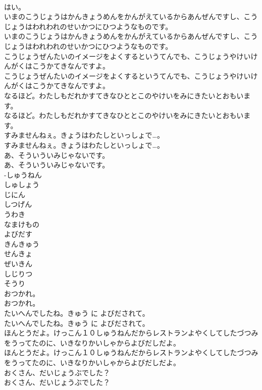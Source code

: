 \documentclass[8pt]{extreport}
\begin{document}
\begin{CJK}{UTF8}{min}
\\	はい。 
\\	いまのこうじょうはかんきょうめんをかんがえているからあんぜんですし、こうじょうはわれわれのせいかつにひつようなものです。	
\\	いまのこうじょうはかんきょうめんをかんがえているからあんぜんですし、こうじょうはわれわれのせいかつにひつようなものです。 
\\	こうじょうぜんたいのイメージをよくするというてんでも、こうじょうやけいけんがくはこうかてきなんですよ。	
\\	こうじょうぜんたいのイメージをよくするというてんでも、こうじょうやけいけんがくはこうかてきなんですよ。 
\\	なるほど。わたしもだれかすてきなひととこのやけいをみにきたいとおもいます。	
\\	なるほど。わたしもだれかすてきなひととこのやけいをみにきたいとおもいます。 
\\	すみませんねぇ。きょうはわたしといっしょで…。	
\\	すみませんねぇ。きょうはわたしといっしょで…。 
\\	あ、そういういみじゃないです。	
\\	あ、そういういみじゃないです。 
\\	-しゅうねん
\\	しゅしょう
\\	じにん
\\	しつげん
\\	うわき
\\	なまけもの
\\	よびだす
\\	きんきゅう
\\	せんきょ
\\	ぜいきん
\\	しじりつ
\\	そうり
\\	おつかれ。	
\\	おつかれ。 
\\	たいへんでしたね。きゅう に よびだされて。	
\\	たいへんでしたね。きゅう に よびだされて。 
\\	ほんとうだよ。けっこん１０しゅうねんだからレストランよやくしてしたづつみをうってたのに、いきなりかいしゃからよびだしだよ。	
\\	ほんとうだよ。けっこん１０しゅうねんだからレストランよやくしてしたづつみをうってたのに、いきなりかいしゃからよびだしだよ。 
\\	おくさん、だいじょうぶでした？	
\\	おくさん、だいじょうぶでした？ 

\end{CJK}
\end{document}
